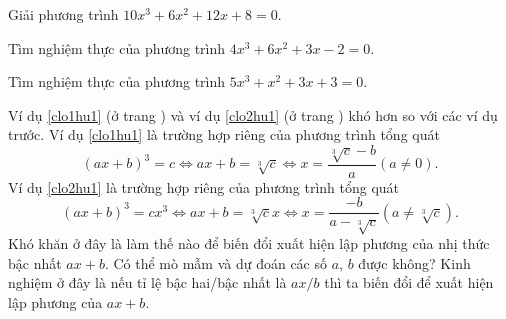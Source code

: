 \begin{vd}%
	Giải phương trình $10x^3 + 6x^2 + 12x + 8 = 0$.
\end{vd}


\begin{vd}%
\label{clo1hu1}Tìm nghiệm thực của phương trình $4x^3+6x^2+3x-2=0$.
\end{vd}

\begin{vd}%
\label{clo2hu1}Tìm nghiệm thực của phương trình $5x^3+x^2+3x+3=0$.
\end{vd}
\begin{note}
	Ví dụ \ref{clo1hu1} (ở trang \pageref{clo1hu1}) và ví dụ \ref{clo2hu1} (ở trang \pageref{clo2hu1}) khó hơn so với các  ví dụ trước. 
	Ví dụ \ref{clo1hu1} là trường hợp riêng của phương trình tổng quát
	$$(ax+b)^3=c\Leftrightarrow ax+b=\sqrt[3]{c}\Leftrightarrow x=\dfrac{\sqrt[3]{c}-b}{a}\left(a\ne 0\right).$$
	Ví dụ \ref{clo2hu1} là trường hợp riêng của phương trình tổng quát
	$$(ax+b)^3=cx^3\Leftrightarrow ax+b=\sqrt[3]{c}x\Leftrightarrow x=\dfrac{-b}{a-\sqrt[3]{c}}\left(a\ne \sqrt[3]{c}\right).$$
	Khó khăn ở đây là làm thế nào để biến đổi xuất hiện lập phương của nhị thức bậc nhất $ax+b$.  Có thể mò mẫm và dự đoán các số $a$, $b$ được không?
	Kinh nghiệm ở đây là nếu tỉ lệ bậc hai/bậc nhất là $ax/b$ thì ta biến đổi để xuất hiện lập phương của $ax+b$.
\end{note}


